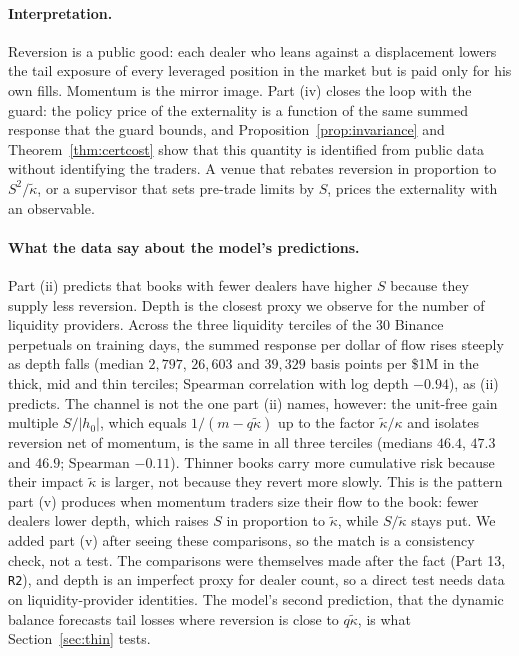 \documentclass[12pt]{article}
\theoremstyle{definition}
\theoremstyle{remark}
\begin{document}
\paragraph{Interpretation.} Reversion is a public good: each dealer who leans against a displacement lowers the tail exposure of every leveraged position in the market but is paid only for his own fills. Momentum is the mirror image. Part (iv) closes the loop with the guard: the policy price of the externality is a function of the same summed response that the guard bounds, and Proposition~\ref{prop:invariance} and Theorem~\ref{thm:certcost} show that this quantity is identified from public data without identifying the traders. A venue that rebates reversion in proportion to $S^2/\tilde\kappa$, or a supervisor that sets pre-trade limits by $S$, prices the externality with an observable.

\paragraph{What the data say about the model's predictions.} Part (ii) predicts that books with fewer dealers have higher $S$ because they supply less reversion. Depth is the closest proxy we observe for the number of liquidity providers. Across the three liquidity terciles of the 30 Binance perpetuals on training days, the summed response per dollar of flow rises steeply as depth falls (median $2{,}797$, $26{,}603$ and $39{,}329$ basis points per \$1M in the thick, mid and thin terciles; Spearman correlation with log depth $-0.94$), as (ii) predicts. The channel is not the one part (ii) names, however: the unit-free gain multiple $S/|h_0|$, which equals $1/(m-q\tilde\kappa)$ up to the factor $\tilde\kappa/\kappa$ and isolates reversion net of momentum, is the same in all three terciles (medians $46.4$, $47.3$ and $46.9$; Spearman $-0.11$). Thinner books carry more cumulative risk because their impact $\tilde\kappa$ is larger, not because they revert more slowly. This is the pattern part (v) produces when momentum traders size their flow to the book: fewer dealers lower depth, which raises $S$ in proportion to $\tilde\kappa$, while $S/\tilde\kappa$ stays put. We added part (v) after seeing these comparisons, so the match is a consistency check, not a test. The comparisons were themselves made after the fact (Part 13, \texttt{R2}), and depth is an imperfect proxy for dealer count, so a direct test needs data on liquidity-provider identities. The model's second prediction, that the dynamic balance forecasts tail losses where reversion is close to $q\tilde\kappa$, is what Section~\ref{sec:thin} tests.
\end{document}
